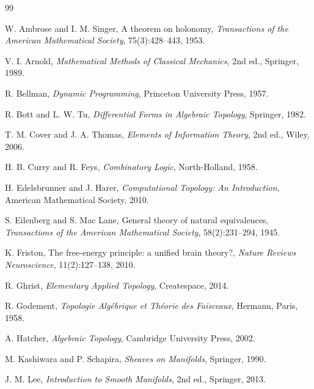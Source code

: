\documentclass[12pt, a4paper]{article}
\theoremstyle{rsvpstyle}
\theoremstyle{definition}
\begin{document}
\clearpage
\begin{thebibliography}{99}

W. Ambrose and I. M. Singer, A theorem on holonomy,
\textit{Transactions of the American Mathematical Society}, 75(3):428--443, 1953.

V. I. Arnold, \textit{Mathematical Methods of Classical Mechanics}, 2nd ed., Springer, 1989.

R. Bellman, \textit{Dynamic Programming}, Princeton University Press, 1957.

R. Bott and L. W. Tu, \textit{Differential Forms in Algebraic Topology}, Springer, 1982.

T. M. Cover and J. A. Thomas, \textit{Elements of Information Theory}, 2nd ed., Wiley, 2006.

H. B. Curry and R. Feys, \textit{Combinatory Logic}, North-Holland, 1958.

H. Edelsbrunner and J. Harer, \textit{Computational Topology: An Introduction},
American Mathematical Society, 2010.

S. Eilenberg and S. Mac Lane, General theory of natural equivalences,
\textit{Transactions of the American Mathematical Society}, 58(2):231--294, 1945.

K. Friston, The free-energy principle: a unified brain theory?,
\textit{Nature Reviews Neuroscience}, 11(2):127--138, 2010.

R. Ghrist, \textit{Elementary Applied Topology}, Createspace, 2014.

R. Godement, \textit{Topologie Alg\'{e}brique et Th\'{e}orie des Faisceaux},
Hermann, Paris, 1958.

A. Hatcher, \textit{Algebraic Topology}, Cambridge University Press, 2002.

M. Kashiwara and P. Schapira, \textit{Sheaves on Manifolds}, Springer, 1990.

J. M. Lee, \textit{Introduction to Smooth Manifolds}, 2nd ed., Springer, 2013.


\end{thebibliography}
\end{document}
